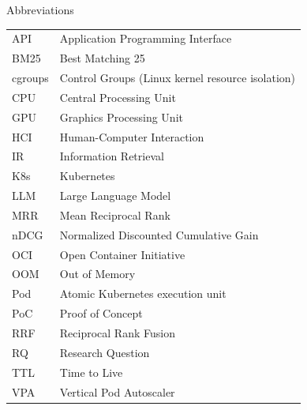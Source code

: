 \documentclass{uetgraduation}
\begin{document}
\begin{contentlisting}
\tableofcontents
{}
\listoffigures
{}
\listoftables
{}
\listofalgorithms
{}
\begin{contentlistingsection}{Abbreviations}
\begin{tabular}{ll}
API & Application Programming Interface\\
BM25 & Best Matching 25\\
cgroups & Control Groups (Linux kernel resource isolation)\\
CPU & Central Processing Unit\\
GPU & Graphics Processing Unit\\
HCI & Human-Computer Interaction\\
IR & Information Retrieval\\
K8s & Kubernetes\\
LLM & Large Language Model\\
MRR & Mean Reciprocal Rank\\
nDCG & Normalized Discounted Cumulative Gain\\
OCI & Open Container Initiative\\
OOM & Out of Memory\\
Pod & Atomic Kubernetes execution unit\\
PoC & Proof of Concept\\
RRF & Reciprocal Rank Fusion\\
RQ & Research Question\\
TTL & Time to Live\\
VPA & Vertical Pod Autoscaler\\
\end{tabular}
\end{contentlistingsection}
\end{contentlisting}






\end{document}
